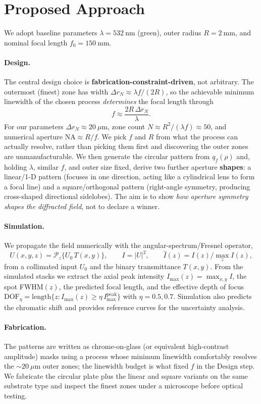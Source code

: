 \documentclass[11pt,a4paper]{article}
\begin{document}
\section{Proposed Approach}

We adopt baseline parameters $\lambda=532~\mathrm{nm}$ (green), outer radius $R=2~\mathrm{mm}$, and nominal focal length $f_0=150~\mathrm{mm}$.

\paragraph{Design.} The central design choice is \textbf{fabrication-constraint-driven}, not arbitrary. The outermost (finest) zone has width $\Delta r_N \approx \lambda f/(2R)$, so the achievable minimum linewidth of the chosen process \emph{determines} the focal length through
\[
f \approx \frac{2R\,\Delta r_N}{\lambda}.
\]
For our parameters $\Delta r_N \approx 20~\mu\mathrm{m}$, zone count $N \approx R^2/(\lambda f)\approx 50$, and numerical aperture $\mathrm{NA}\approx R/f$. We pick $f$ and $R$ from what the process can actually resolve, rather than picking them first and discovering the outer zones are unmanufacturable. We then generate the circular pattern from $q_f(\rho)$ and, holding $\lambda$, similar $f$, and outer size fixed, derive two further aperture \textbf{shapes}: a linear/1-D pattern (focuses in one direction, acting like a cylindrical lens to form a focal line) and a square/orthogonal pattern (right-angle symmetry, producing cross-shaped directional sidelobes). The aim is to show \emph{how aperture symmetry shapes the diffracted field}, not to declare a winner.

\paragraph{Simulation.} We propagate the field numerically with the angular-spectrum/Fresnel operator,
\[
U(x,y,z)=\mathcal{P}_z\{U_0\,T(x,y)\},\qquad I=|U|^2,\qquad \hat I(z)=I(z)/\max_z I(z),
\]
from a collimated input $U_0$ and the binary transmittance $T(x,y)$. From the simulated stacks we extract the axial peak intensity $I_{\max}(z)=\max_{x,y} I$, the spot FWHM$(z)$, the predicted focal length, and the effective depth of focus $\mathrm{DOF}_\eta=\mathrm{length}\{z: I_{\max}(z)\ge \eta\,I_{\max}^{\mathrm{peak}}\}$ with $\eta=0.5,0.7$. Simulation also predicts the chromatic shift and provides reference curves for the uncertainty analysis.

\paragraph{Fabrication.} The patterns are written as chrome-on-glass (or equivalent high-contrast amplitude) masks using a process whose minimum linewidth comfortably resolves the $\sim 20~\mu\mathrm{m}$ outer zones; the linewidth budget is what fixed $f$ in the Design step. We fabricate the circular plate plus the linear and square variants on the same substrate type and inspect the finest zones under a microscope before optical testing.
\end{document}
